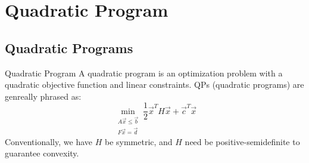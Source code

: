 \chapter{Quadratic Program}

\section{Quadratic Programs}
\begin{ln-define}{Quadratic Program}{}
    A quadratic program is an optimization problem with a quadratic objective function and linear constraints.
    \tcblower
    QPs (quadratic programs) are genreally phrased as:
    \[
        \min_{
            \substack{
                A \vec{x} \leq \vec{b} \\
                F \vec{x} = \vec{d}
            }
        } \frac{1}{2} \vec{x}^T H \vec{x} + \vec{c}^T \vec{x}
    \]
    Conventionally, we have $H$ be symmetric, and $H$ need be positive-semidefinite to guarantee convexity.
\end{ln-define}


